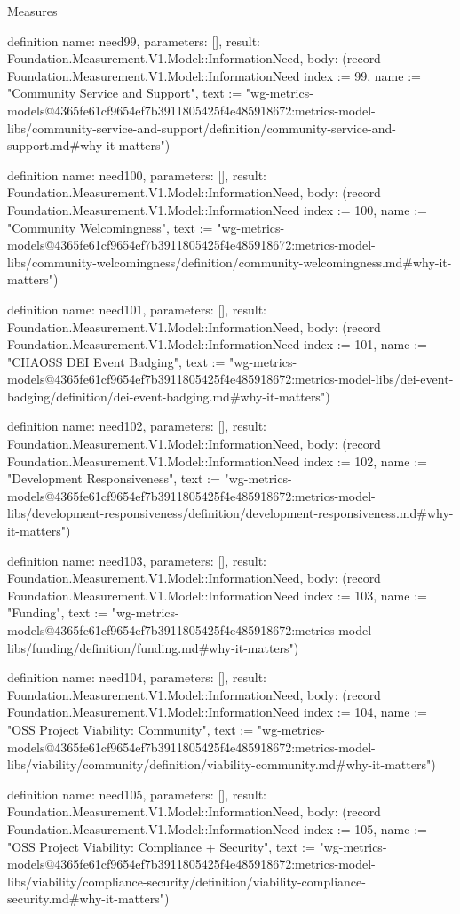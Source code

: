 \begin{lexlean}{Measures}
\begin{semanticmodule}
definition{
  name: need99,
  parameters: [],
  result: Foundation.Measurement.V1.Model::InformationNeed,
  body: (record Foundation.Measurement.V1.Model::InformationNeed {index := 99, name := "Community Service and Support", text := "wg-metrics-models@4365fe61cf9654ef7b3911805425f4e485918672:metrics-model-libs/community-service-and-support/definition/community-service-and-support.md#why-it-matters"})
}

definition{
  name: need100,
  parameters: [],
  result: Foundation.Measurement.V1.Model::InformationNeed,
  body: (record Foundation.Measurement.V1.Model::InformationNeed {index := 100, name := "Community Welcomingness", text := "wg-metrics-models@4365fe61cf9654ef7b3911805425f4e485918672:metrics-model-libs/community-welcomingness/definition/community-welcomingness.md#why-it-matters"})
}

definition{
  name: need101,
  parameters: [],
  result: Foundation.Measurement.V1.Model::InformationNeed,
  body: (record Foundation.Measurement.V1.Model::InformationNeed {index := 101, name := "CHAOSS DEI Event Badging", text := "wg-metrics-models@4365fe61cf9654ef7b3911805425f4e485918672:metrics-model-libs/dei-event-badging/definition/dei-event-badging.md#why-it-matters"})
}

definition{
  name: need102,
  parameters: [],
  result: Foundation.Measurement.V1.Model::InformationNeed,
  body: (record Foundation.Measurement.V1.Model::InformationNeed {index := 102, name := "Development Responsiveness", text := "wg-metrics-models@4365fe61cf9654ef7b3911805425f4e485918672:metrics-model-libs/development-responsiveness/definition/development-responsiveness.md#why-it-matters"})
}

definition{
  name: need103,
  parameters: [],
  result: Foundation.Measurement.V1.Model::InformationNeed,
  body: (record Foundation.Measurement.V1.Model::InformationNeed {index := 103, name := "Funding", text := "wg-metrics-models@4365fe61cf9654ef7b3911805425f4e485918672:metrics-model-libs/funding/definition/funding.md#why-it-matters"})
}

definition{
  name: need104,
  parameters: [],
  result: Foundation.Measurement.V1.Model::InformationNeed,
  body: (record Foundation.Measurement.V1.Model::InformationNeed {index := 104, name := "OSS Project Viability: Community", text := "wg-metrics-models@4365fe61cf9654ef7b3911805425f4e485918672:metrics-model-libs/viability/community/definition/viability-community.md#why-it-matters"})
}

definition{
  name: need105,
  parameters: [],
  result: Foundation.Measurement.V1.Model::InformationNeed,
  body: (record Foundation.Measurement.V1.Model::InformationNeed {index := 105, name := "OSS Project Viability: Compliance + Security", text := "wg-metrics-models@4365fe61cf9654ef7b3911805425f4e485918672:metrics-model-libs/viability/compliance-security/definition/viability-compliance-security.md#why-it-matters"})
}


\end{semanticmodule}
\end{lexlean}
